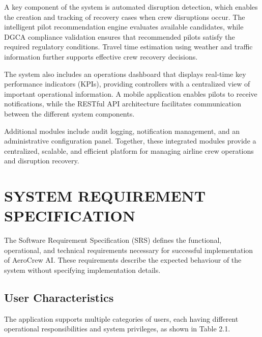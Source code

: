 \documentclass[12pt,a4paper]{report}
\begin{document}
A key component of the system is automated disruption detection, which enables the creation and tracking of recovery cases when crew disruptions occur. The intelligent pilot recommendation engine evaluates available candidates, while DGCA compliance validation ensures that recommended pilots satisfy the required regulatory conditions. Travel time estimation using weather and traffic information further supports effective crew recovery decisions.

The system also includes an operations dashboard that displays real-time key performance indicators (KPIs), providing controllers with a centralized view of important operational information. A mobile application enables pilots to receive notifications, while the RESTful API architecture facilitates communication between the different system components.

Additional modules include audit logging, notification management, and an administrative configuration panel. Together, these integrated modules provide a centralized, scalable, and efficient platform for managing airline crew operations and disruption recovery.

\section{SYSTEM REQUIREMENT SPECIFICATION}

The Software Requirement Specification (SRS) defines the functional, operational, and technical requirements necessary for successful implementation of AeroCrew AI. These requirements describe the expected behaviour of the system without specifying implementation details.

\subsection{User Characteristics}

The application supports multiple categories of users, each having different operational responsibilities and system privileges, as shown in Table 2.1.
\end{document}
